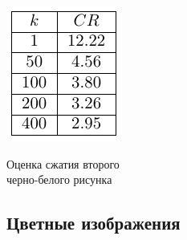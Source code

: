 \documentclass[a4paper]{article}
\begin{document}
\begin{table}[H]
    \centering
    \includegraphics[]{tables/CR_for_Adams_The_Tetons_and_the_Snake_River.pdf}
    \caption{Оценка сжатия второго\\черно-белого рисунка}
    \label{tab:mount}
\end{table}
\subsection{Цветные изображения}
\end{document}
